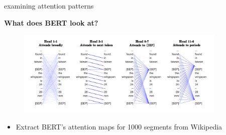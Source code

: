 \begin{frame}{examining attention patterns}

\vfill

\textbf{What does BERT look at?} 

	\begin{figure}
		\centering
		\includegraphics[width = 10cm]{figure/what-bert-look-at.png}\\ 
	\end{figure}
	
	\begin{itemize}
		\item Extract BERT's attention maps for 1000 segments from Wikipedia
	\end{itemize}
	
\vfill

\end{frame}



